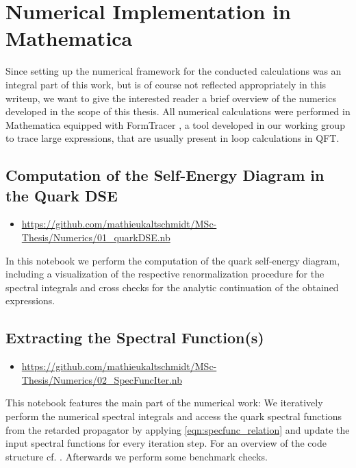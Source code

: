 \chapter{Numerical Implementation in Mathematica}\label{chap:appendixC}
Since setting up the numerical framework for the conducted calculations was an integral part of this work, but is of course not reflected appropriately in this writeup, we want to give the interested reader a brief overview of the numerics developed in the scope of this thesis. All numerical calculations were performed in Mathematica \cite{Mathematica} equipped with FormTracer \cite{FormTracer}, a tool developed in our working group to trace large expressions, that are usually present in loop calculations in QFT.
\section*{Computation of the Self-Energy Diagram in the Quark DSE}
\begin{itemize}
	\item \footnotesize\url{https://github.com/mathieukaltschmidt/MSc-Thesis/Numerics/01_quarkDSE.nb}
\end{itemize}
In this notebook we perform the computation of the quark self-energy diagram, including a visualization of the respective renormalization procedure for the spectral integrals and cross checks for the analytic continuation of the obtained expressions.

\section*{Extracting the Spectral Function(s)}
\begin{itemize}
	\item \footnotesize\url{https://github.com/mathieukaltschmidt/MSc-Thesis/Numerics/02_SpecFuncIter.nb}
\end{itemize}
This notebook features the main part of the numerical work: We iteratively perform the numerical spectral integrals and access the quark spectral functions from the retarded propagator  by applying \eqref{eqn:specfunc_relation} and update the input spectral functions for every iteration step. For an overview of the code structure cf. . Afterwards we perform some benchmark checks. \\
\newpage
